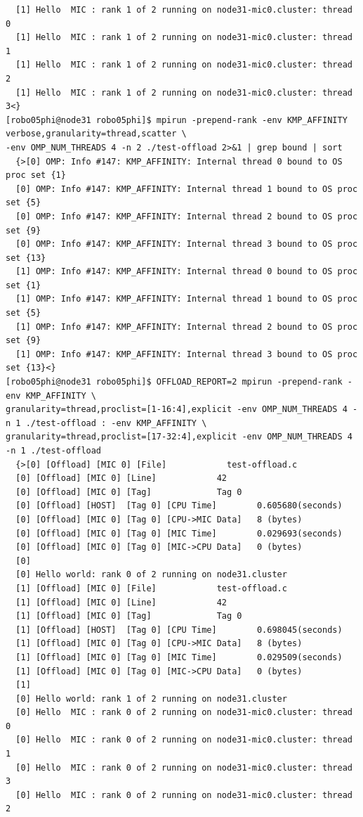 \documentclass[pscyr,10pt]{hedlab}
\begin{document}
\begin{lstlisting}
  [1] Hello  MIC : rank 1 of 2 running on node31-mic0.cluster: thread 0
  [1] Hello  MIC : rank 1 of 2 running on node31-mic0.cluster: thread 1
  [1] Hello  MIC : rank 1 of 2 running on node31-mic0.cluster: thread 2
  [1] Hello  MIC : rank 1 of 2 running on node31-mic0.cluster: thread 3<}
[robo05phi@node31 robo05phi]$ mpirun -prepend-rank -env KMP_AFFINITY verbose,granularity=thread,scatter \
-env OMP_NUM_THREADS 4 -n 2 ./test-offload 2>&1 | grep bound | sort
  {>[0] OMP: Info #147: KMP_AFFINITY: Internal thread 0 bound to OS proc set {1}
  [0] OMP: Info #147: KMP_AFFINITY: Internal thread 1 bound to OS proc set {5}
  [0] OMP: Info #147: KMP_AFFINITY: Internal thread 2 bound to OS proc set {9}
  [0] OMP: Info #147: KMP_AFFINITY: Internal thread 3 bound to OS proc set {13}
  [1] OMP: Info #147: KMP_AFFINITY: Internal thread 0 bound to OS proc set {1}
  [1] OMP: Info #147: KMP_AFFINITY: Internal thread 1 bound to OS proc set {5}
  [1] OMP: Info #147: KMP_AFFINITY: Internal thread 2 bound to OS proc set {9}
  [1] OMP: Info #147: KMP_AFFINITY: Internal thread 3 bound to OS proc set {13}<}
[robo05phi@node31 robo05phi]$ OFFLOAD_REPORT=2 mpirun -prepend-rank -env KMP_AFFINITY \
granularity=thread,proclist=[1-16:4],explicit -env OMP_NUM_THREADS 4 -n 1 ./test-offload : -env KMP_AFFINITY \
granularity=thread,proclist=[17-32:4],explicit -env OMP_NUM_THREADS 4 -n 1 ./test-offload
  {>[0] [Offload] [MIC 0] [File]            test-offload.c
  [0] [Offload] [MIC 0] [Line]            42
  [0] [Offload] [MIC 0] [Tag]             Tag 0
  [0] [Offload] [HOST]  [Tag 0] [CPU Time]        0.605680(seconds)
  [0] [Offload] [MIC 0] [Tag 0] [CPU->MIC Data]   8 (bytes)
  [0] [Offload] [MIC 0] [Tag 0] [MIC Time]        0.029693(seconds)
  [0] [Offload] [MIC 0] [Tag 0] [MIC->CPU Data]   0 (bytes)
  [0] 
  [0] Hello world: rank 0 of 2 running on node31.cluster
  [1] [Offload] [MIC 0] [File]            test-offload.c
  [1] [Offload] [MIC 0] [Line]            42
  [1] [Offload] [MIC 0] [Tag]             Tag 0
  [1] [Offload] [HOST]  [Tag 0] [CPU Time]        0.698045(seconds)
  [1] [Offload] [MIC 0] [Tag 0] [CPU->MIC Data]   8 (bytes)
  [1] [Offload] [MIC 0] [Tag 0] [MIC Time]        0.029509(seconds)
  [1] [Offload] [MIC 0] [Tag 0] [MIC->CPU Data]   0 (bytes)
  [1] 
  [0] Hello world: rank 1 of 2 running on node31.cluster
  [0] Hello  MIC : rank 0 of 2 running on node31-mic0.cluster: thread 0
  [0] Hello  MIC : rank 0 of 2 running on node31-mic0.cluster: thread 1
  [0] Hello  MIC : rank 0 of 2 running on node31-mic0.cluster: thread 3
  [0] Hello  MIC : rank 0 of 2 running on node31-mic0.cluster: thread 2

\end{lstlisting}
\end{document}
